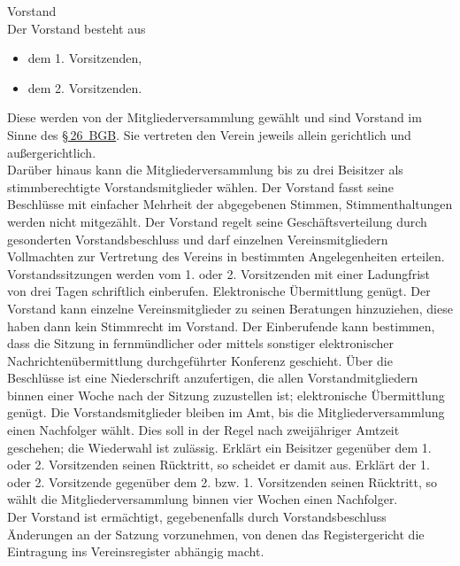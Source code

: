 \documentclass[fontsize=11pt,pagesize,parskip=half]{scrartcl}
\begin{document}
\begin{contract}
Vorstand\\
Der Vorstand besteht aus
\begin{itemize}
\item dem 1. Vorsitzenden,
\item dem 2. Vorsitzenden.
\end{itemize}
Diese werden von der Mitgliederversammlung gewählt und sind Vorstand im Sinne des \href{https://dejure.org/gesetze/BGB/26.html}{§\,26~BGB}. Sie vertreten den Verein jeweils allein gerichtlich und außergerichtlich.\\
Darüber hinaus kann die Mitgliederversammlung bis zu drei Beisitzer als stimmberechtigte Vorstandsmitglieder wählen. Der Vorstand fasst seine Beschlüsse mit einfacher Mehrheit der abgegebenen Stimmen, Stimmenthaltungen werden nicht mitgezählt. Der Vorstand regelt seine Geschäftsverteilung durch gesonderten Vorstandsbeschluss und darf einzelnen Vereinsmitgliedern Vollmachten zur Vertretung des Vereins in bestimmten Angelegenheiten erteilen. Vorstandssitzungen werden vom 1. oder 2. Vorsitzenden mit einer Ladungfrist von drei Tagen schriftlich einberufen. Elektronische Übermittlung genügt. Der Vorstand kann einzelne Vereinsmitglieder zu seinen Beratungen hinzuziehen, diese haben dann kein Stimmrecht im Vorstand. Der Einberufende kann bestimmen, dass die Sitzung in fernmündlicher oder mittels sonstiger elektronischer Nachrichtenübermittlung durchgeführter Konferenz geschieht. Über die Beschlüsse ist eine Niederschrift anzufertigen, die allen Vorstandmitgliedern binnen einer Woche nach der Sitzung zuzustellen ist; elektronische Übermittlung genügt. Die Vorstandsmitglieder bleiben im Amt, bis die Mitgliederversammlung einen Nachfolger wählt. Dies soll in der Regel nach zweijähriger Amtzeit geschehen; die Wiederwahl ist zulässig. Erklärt ein Beisitzer gegenüber dem 1. oder 2. Vorsitzenden seinen Rücktritt, so scheidet er damit aus. Erklärt der 1. oder 2. Vorsitzende gegenüber dem 2. bzw. 1. Vorsitzenden seinen Rücktritt, so wählt die Mitgliederversammlung binnen vier Wochen einen Nachfolger.\\
Der Vorstand ist ermächtigt, gegebenenfalls durch Vorstandsbeschluss Änderungen an der Satzung vorzunehmen, von denen das Registergericht die Eintragung ins Vereinsregister abhängig macht.



\end{contract}
\end{document}
